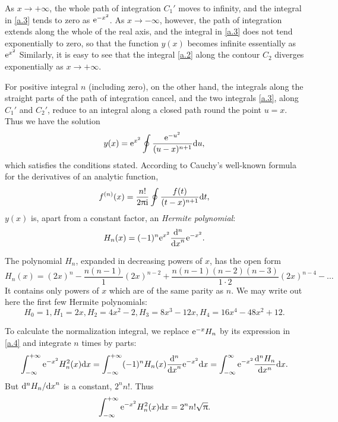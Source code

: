 






As $ x \to +\infty $, the whole path of integration $ C_1' $ moves to infinity, and the integral in \eqref{a.3} tends to zero as $ \mathrm{e}^{-x^2} $. As $ x \to-\infty $, however, the path of integration extends along the whole of the real axis, and the integral in \eqref{a.3} does not tend exponentially to zero, so that the function $ y (x) $ becomes infinite essentially as $ \mathrm{e}^{x^2} $ Similarly, it is easy to see that the integral \eqref{a.2} along the contour $ C_2 $ diverges exponentially as $ x \to+\infty $.

For positive integral $ n $ (including zero), on the other hand, the integrals along the straight parts of the path of integration cancel, and the two integrals \eqref{a.3}, along $ C_1' $ and $ C_2' $, reduce to an integral along a closed path round the point $ u = x $. Thus we have the solution
\[ y(x)=\mathrm{e}^{x^2}\oint\frac{\mathrm{e}^{-u^2}}{(u-x)^{n+1}}\mathrm{d} u, \]
which satisfies the conditions stated. According to Cauchy’s well-known formula for the derivatives of an analytic function,
\[ f^{(n)}(x)=\frac{n!}{2\uppi\mathrm{i}}\oint\frac{f(t)}{(t-x)^{n+1}}\mathrm{d} t, \]
$ y (x) $ is, apart from a constant factor, an \textit{Hermite polynomial}:
\begin{equation}\label{a.4}
H_n(x)=(-1)^n\mathrm{e}^{x^2}\frac{\mathrm{d}^n}{{\mathrm{d} x}^n}\mathrm{e}^{-x^2}.
\end{equation}



The polynomial $ H_n $, expanded in decreasing powers of $ x $, has the open form
\begin{equation}\label{a.5}
H_n(x)=(2x)^n-\frac{n(n-1)}{1}(2x)^{n-2}+\frac{n(n-1)(n-2)(n-3)}{1\cdot2}(2x)^{n-4}-\dots
\end{equation}
It contains only powers of $ x $ which are of the same parity as $ n $. We may write out here the first few Hermite polynomials:
\begin{equation}\label{a.6}
H_0=1, H_1=2x, H_2=4x^2-2, H_3=8x^3-12x, H_4=16x^4-48x^2+12.
\end{equation}



To calculate the normalization integral, we replace $ \mathrm{e}^{-x} H_n $ by its expression in \eqref{a.4} and integrate $ n $ times by parts:
\[ \int_{-\infty}^{+\infty}\mathrm{e}^{-x^2}H_n^2(x)\mathrm{d} x=\int_{-\infty}^{+\infty}(-1)^nH_n(x)\frac{\mathrm{d}^n}{{\mathrm{d} x}^n}\mathrm{e}^{-x^2}\mathrm{d} x=\int_{-\infty}^{\infty}\mathrm{e}^{-x^2}\frac{\mathrm{d}^nH_n}{\mathrm{d} x^n}\mathrm{d} x. \]
But $\mathrm{d}^nH_n/{\mathrm{d} x}^n $ is a constant, $ 2^nn! $. Thus
\begin{equation}\label{a.7}
\int_{-\infty}^{+\infty}\mathrm{e}^{-x^2}H_n^2(x)\mathrm{d} x=2^nn!\sqrt{\uppi}.
\end{equation}


